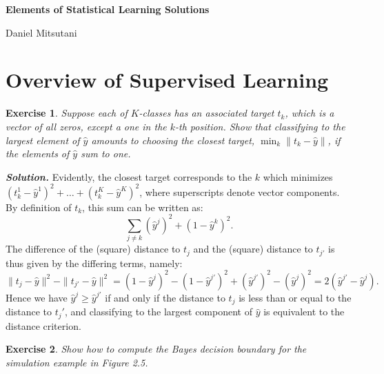 \documentclass[12pt]{article}
\newtheorem{exercise}{Exercise}[section]
\newenvironment{solution}[1][\it{Solution}]{\textbf{#1. } }{\vspace{.5cm}}
\begin{document}
\begin{center}
\noindent  \textbf{\Large Elements of Statistical Learning Solutions}
\vspace{.2cm}

\noindent 	Daniel Mitsutani
\end{center}
\newpage


\section{Overview of Supervised Learning}
\hrulefill
\vspace{.6cm}

\begin{exercise}
Suppose each of $K$-classes has an associated target $t_k$, which is a vector of all zeros, except a one in the $k$-th position. Show that classifying to the largest element of $\hat{y}$ amounts to choosing the closest target, $\min_k \|t_k - \hat{y}\|$, if the elements of $\hat{y}$ sum to one.	
\end{exercise}

\begin{solution}
Evidently, the closest target corresponds to the $k$ which minimizes $(t_k^1 - \hat{y}^1)^2 + \dots + (t_k^K - \hat{y}^K)^2$, where superscripts denote vector components. By definition of $t_k$, this sum can be written as:
$$\sum_{j \neq k} (\hat{y}^j)^2 + (1 - \hat{y}^k)^2.$$
The difference of the (square) distance to $t_j$ and the (square) distance to $t_{j'}$ is thus given by the differing terms, namely:
$$\|t_j - \hat{y}\|^2 - \|t_{j'} - \hat{y}\|^2 = (1 - \hat{y}^j)^2 - (1 - \hat{y}^{j'})^2 + (\hat{y}^{j'})^2 - (\hat{y}^j)^2 = 2(\hat{y}^{j'} - \hat{y}^{j}).$$
Hence we have $\hat{y}^{j} \geq \hat{y}^{j'}$ if and only if the distance to $t_j$ is less than or equal to the distance to $t_j'$, and classifying to the largest component of $\hat{y}$ is equivalent to the distance criterion.
\end{solution}


\begin{exercise}
	Show how to compute the Bayes decision boundary for the simulation example in Figure 2.5.
\end{exercise}
\end{document}
